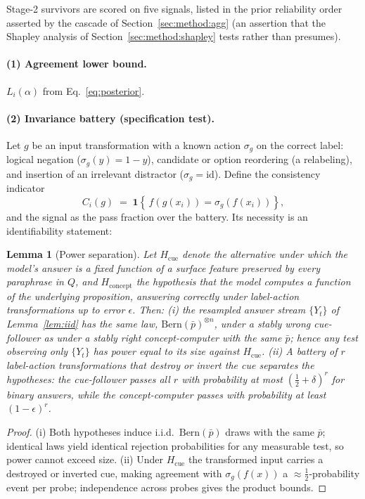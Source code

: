 \documentclass[11pt]{article}
\newtheorem{lemma}{Lemma}
\newcommand{\pbar}{\bar{p}}
\newcommand{\ind}{\mathbf{1}}
\newcommand{\Bern}{\mathrm{Bern}}
\begin{document}
Stage-2 survivors are scored on five signals, listed in the prior
reliability order asserted by the cascade of
Section~\ref{sec:method:agg} (an assertion that the Shapley analysis of
Section~\ref{sec:method:shapley} tests rather than presumes).

\paragraph{(1) Agreement lower bound.} $L_i(\alpha)$ from
Eq.~\eqref{eq:posterior}.

\paragraph{(2) Invariance battery (specification test).}
Let $g$ be an input transformation with a known action $\sigma_g$ on the
correct label: logical negation ($\sigma_g(y) = 1 - y$), candidate or
option reordering (a relabeling), and insertion of an irrelevant
distractor ($\sigma_g = \mathrm{id}$). Define the consistency indicator
\begin{equation}
  C_i(g) \;=\; \ind\!\left\{\, f\!\left(g(x_i)\right) =
  \sigma_g\!\left(f(x_i)\right) \right\},
  \label{eq:flip}
\end{equation}
and the signal as the pass fraction over the battery. Its necessity is
an identifiability statement:

\begin{lemma}[Power separation]
\label{lem:power}
Let $H_{\mathrm{cue}}$ denote the alternative under which the model's
answer is a fixed function of a surface feature preserved by every
paraphrase in $Q$, and $H_{\mathrm{concept}}$ the hypothesis that the
model computes a function of the underlying proposition, answering
correctly under label-action transformations up to error $\epsilon$.
Then: (i) the resampled answer stream $\{Y_t\}$ of
Lemma~\ref{lem:iid} has the same law, $\Bern(\pbar)^{\otimes n}$, under
a stably wrong cue-follower as under a stably right concept-computer
with the same $\pbar$; hence any test observing only $\{Y_t\}$ has
power equal to its size against $H_{\mathrm{cue}}$. (ii) A battery of
$r$ label-action transformations that destroy or invert the cue
separates the hypotheses: the cue-follower passes all $r$ with
probability at most $(\tfrac12 + \delta)^{r}$ for binary answers,
while the concept-computer passes with probability at least
$(1-\epsilon)^{r}$.
\end{lemma}

\begin{proof}
(i) Both hypotheses induce i.i.d.\ $\Bern(\pbar)$ draws with the same
$\pbar$; identical laws yield identical rejection probabilities for any
measurable test, so power cannot exceed size. (ii) Under
$H_{\mathrm{cue}}$ the transformed input carries a destroyed or
inverted cue, making agreement with $\sigma_g(f(x))$ a
$\approx\!\tfrac12$-probability event per probe; independence across
probes gives the product bounds.
\end{proof}
\end{document}
